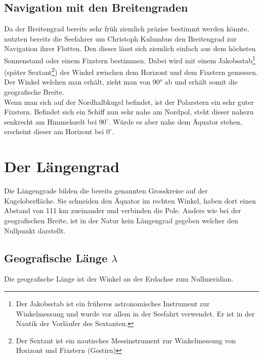 \begin{refsection}

\subsection{Navigation mit den Breitengraden}
Da der Breitengrad bereits sehr früh ziemlich präzise bestimmt werden könnte, nutzten bereits die Seefahrer um Christoph Kulumbus den Breitengrad zur Navigation ihrer Flotten.
Den dieser lässt sich ziemlich einfach aus dem höchsten Sonnenstand oder einem Fixstern bestimmen. Dabei wird mit einem Jakobsstab\footnote{%
Der Jakobsstab ist ein früheres astronomisches Instrument zur Winkelmessung und wurde vor allem in der Seefahrt verwendet. Er ist in der Nautik der Vorläufer des Sextanten.} (später Sextant\footnote{%
Der Sextant ist ein nautisches Messinstrument zur Winkelmessung von Horizont und Fixstern (Gestirn)}) der Winkel zwischen dem Horizont und dem Fixstern gemessen. Der Winkel welchen man erhält, zieht man von 90° ab und erhält somit die geografische Breite. \\


Wenn man sich auf der Nordhalbkugel befindet, ist der Polarstern ein sehr guter Fixstern. Befindet sich ein Schiff nun sehr nahe am Nordpol, steht dieser nahezu senkrecht am Himmelszelt bei $90^{\circ}$. Würde es aber nahe dem Äquator stehen, erscheint dieser am Horizont bei $0^{\circ}$.


\section{Der Längengrad}
Die Längengrade bilden die bereits genannten Grosskreise auf der Kugeloberfläche.
Sie schneiden den Äquator im rechten Winkel, haben dort einen Abstand von 111 km zueinander und verbinden die Pole. Anders wie bei der geografischen Breite, ist in der Natur kein Längengrad gegeben welcher den Nullpunkt darstellt.


\subsection{Geografische Länge $\lambda$}
\begin{definition}
Die geografische Länge ist der Winkel an der Erdachse zum Nullmeridian.
\end{definition}



\end{refsection}
